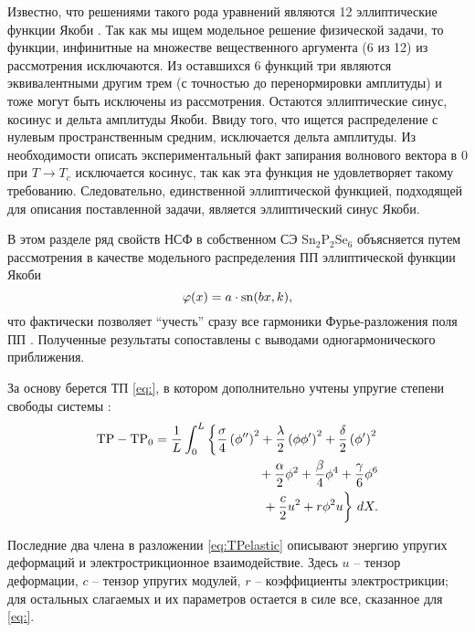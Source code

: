 Известно, что решениями такого рода уравнений являются 12 эллиптические функции Якоби \cite{Korn1973}. 
Так как мы ищем модельное решение физической задачи, то функции, инфинитные на множестве вещественного аргумента (6 из 12) из рассмотрения исключаются. 
Из оставшихся 6 функций три являются эквивалентными другим трем (с точностью до перенормировки амплитуды) и тоже могут быть исключены из рассмотрения. 
Остаются эллиптические синус, косинус и дельта амплитуды Якоби. 
Ввиду того, что ищется распределение с нулевым пространственным средним, исключается дельта амплитуды. 
Из необходимости описать экспериментальный факт запирания волнового вектора в 0 при $T\rightarrow T_c$ исключается косинус, так как эта функция не удовлетворяет такому требованию. 
Следовательно, единственной эллиптической функцией, подходящей для описания поставленной задачи, является эллиптический синус Якоби.

В этом разделе ряд свойств НСФ в собственном СЭ Sn$_2$P$_2$Se$_6$ объясняется путем рассмотрения в качестве модельного распределения ПП эллиптической функции Якоби 
\begin{equation}
\varphi(x) = a \cdot \operatorname{sn}(bx, k),
\label{eq:snmodel}
\end{equation}
что фактически позволяет ``учесть'' сразу все гармоники Фурье-разложения поля ПП \cite{Berezovsky1998}. 
Полученные результаты сопоставлены с выводами одногармонического приближения.

За основу берется ТП \eqref{eq:}, в котором дополнительно учтены упругие степени свободы системы \cite{Vysochanskii1994, Vysochanskii1990, Ema1990}:
\begin{equation}\label{eq:TPelastic}
\begin{aligned}
\mathrm{TP} - \mathrm{TP}_0 = \frac{1}{L}
 	                      \int^L_0 \left\{\frac{\sigma}{4} \left( \phi'' \right)^2 + 
 	                      \frac{\lambda}{2}\left(\phi\phi'\right)^2 + 
 	                      \frac{\delta}{2}\left(\phi'\right)^2 \right. \\
 	                      {} +  \frac{\alpha}{2}\phi^2 + \frac{\beta}{4}\phi^4 + 
 	                      \frac{\gamma}{6}\phi^6 \\
 	                      \left. \vphantom{\frac{\lambda}{2}} 
 	                      + \frac{c}{2}u^2 + r\phi^2 u \right\}\,dX.
\end{aligned}
\end{equation}

Последние два члена в разложении \eqref{eq:TPelastic} описывают энергию упругих деформаций и электрострикционное взаимодействие. Здесь $u$ -- тензор деформации, $c$ -- тензор упругих модулей, $r$ -- коэффициенты электрострикции; для остальных слагаемых и их параметров остается в силе все, сказанное для \eqref{eq:}.


